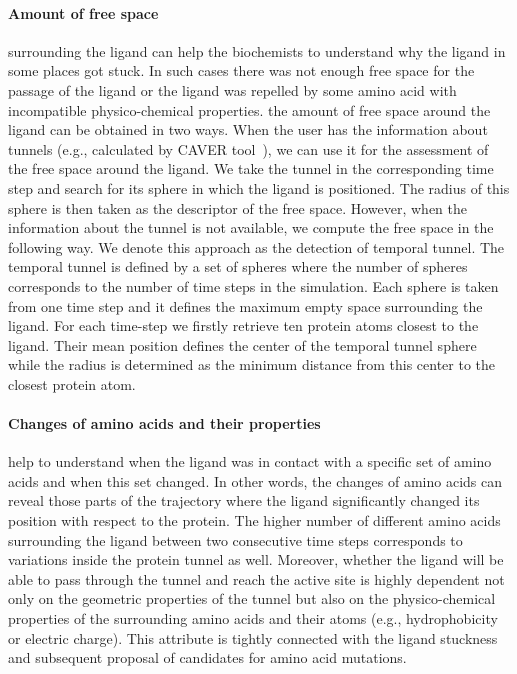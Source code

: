 \documentclass[twocolumn]{bmcart}%
\begin{document}
\paragraph{\textbf{Amount of free space}} surrounding the ligand can help the biochemists to understand why the ligand in some places got stuck.
In such cases there was not enough free space for the passage of the ligand or the ligand was repelled by some amino acid with incompatible physico-chemical properties.
the amount of free space around the ligand can be obtained in two ways.
When the user has the information about tunnels (e.g., calculated by CAVER tool~\cite{Chovancova2012}), we can use it for the assessment of the free space around the ligand.
We take the tunnel in the corresponding time step and search for its sphere in which the ligand is positioned. 
The radius of this sphere is then taken as the descriptor of the free space.
However, when the information about the tunnel is not available, we compute the free space in the following way.
We denote this approach as the detection of temporal tunnel.
The temporal tunnel is defined by a set of spheres where the number of spheres corresponds to the number of time steps in the simulation.
Each sphere is taken from one time step and it defines the maximum empty space surrounding the ligand.
For each time-step we firstly retrieve ten protein atoms closest to the ligand. 
Their mean position defines the center of the temporal tunnel sphere while the radius is determined as the minimum distance from this center to the closest protein atom.

\paragraph{\textbf{Changes of amino acids and their properties}} help to understand when the ligand was in contact with a specific set of amino acids and when this set changed.
In other words, the changes of amino acids can reveal those parts of the trajectory where the ligand significantly changed its position with respect to the protein. 
The higher number of different amino acids surrounding the ligand between two consecutive time steps corresponds to variations inside the protein tunnel as well.
Moreover, whether the ligand will be able to pass through the tunnel and reach the active site is highly dependent not only on the geometric properties of the tunnel but also on the physico-chemical properties of the surrounding amino acids and their atoms (e.g., hydrophobicity or electric charge).
This attribute is tightly connected with the ligand stuckness and subsequent proposal of candidates for amino acid mutations.
\end{document}
